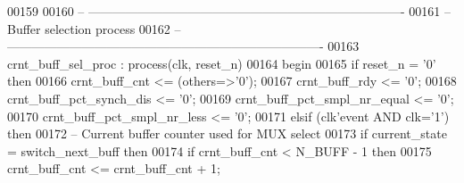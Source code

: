 \begin{DoxyCode}
00159    
00160 \textcolor{keyword}{-- ----------------------------------------------------------------------------}
00161 \textcolor{keyword}{-- Buffer selection process}
00162 \textcolor{keyword}{-- ----------------------------------------------------------------------------     }
00163    crnt\_buff\_sel\_proc : \textcolor{keywordflow}{process}(clk, reset_n)
00164 \textcolor{vhdlkeyword}{   begin}
00165       \textcolor{keywordflow}{if} \textcolor{vhdlchar}{reset_n} \textcolor{vhdlchar}{=} \textcolor{vhdlchar}{'}\textcolor{vhdllogic}{}\textcolor{vhdllogic}{0}\textcolor{vhdlchar}{'} \textcolor{keywordflow}{then} 
00166          \textcolor{vhdlchar}{crnt_buff_cnt}               \textcolor{vhdlchar}{<=} \textcolor{vhdlchar}{(}\textcolor{keywordflow}{others}\textcolor{vhdlchar}{=}\textcolor{vhdlchar}{>}\textcolor{vhdlchar}{'}\textcolor{vhdllogic}{}\textcolor{vhdllogic}{0}\textcolor{vhdlchar}{'}\textcolor{vhdlchar}{)};
00167          \textcolor{vhdlchar}{crnt_buff_rdy}               \textcolor{vhdlchar}{<=} \textcolor{vhdlchar}{'}\textcolor{vhdllogic}{}\textcolor{vhdllogic}{0}\textcolor{vhdlchar}{'};
00168          \textcolor{vhdlchar}{crnt_buff_pct_synch_dis}     \textcolor{vhdlchar}{<=} \textcolor{vhdlchar}{'}\textcolor{vhdllogic}{}\textcolor{vhdllogic}{0}\textcolor{vhdlchar}{'};
00169          \textcolor{vhdlchar}{crnt_buff_pct_smpl_nr_equal} \textcolor{vhdlchar}{<=} \textcolor{vhdlchar}{'}\textcolor{vhdllogic}{}\textcolor{vhdllogic}{0}\textcolor{vhdlchar}{'};
00170          \textcolor{vhdlchar}{crnt_buff_pct_smpl_nr_less}  \textcolor{vhdlchar}{<=} \textcolor{vhdlchar}{'}\textcolor{vhdllogic}{}\textcolor{vhdllogic}{0}\textcolor{vhdlchar}{'};
00171       \textcolor{keywordflow}{elsif} \textcolor{vhdlchar}{(}\textcolor{vhdlchar}{clk}\textcolor{vhdlchar}{'}\textcolor{vhdlkeyword}{event} \textcolor{keywordflow}{AND} \textcolor{vhdlchar}{clk}\textcolor{vhdlchar}{=}\textcolor{vhdlchar}{'}\textcolor{vhdllogic}{}\textcolor{vhdllogic}{1}\textcolor{vhdlchar}{'}\textcolor{vhdlchar}{)} \textcolor{keywordflow}{then}
00172 \textcolor{keyword}{         -- Current buffer counter used for MUX select}
00173          \textcolor{keywordflow}{if} \textcolor{vhdlchar}{current_state} \textcolor{vhdlchar}{=} \textcolor{vhdlchar}{switch\_next\_buff} \textcolor{keywordflow}{then}
00174             \textcolor{keywordflow}{if} \textcolor{vhdlchar}{crnt_buff_cnt} \textcolor{vhdlchar}{<} \textcolor{vhdlchar}{N_BUFF} \textcolor{vhdlchar}{-} \textcolor{vhdllogic}{}\textcolor{vhdllogic}{1} \textcolor{keywordflow}{then}
00175                \textcolor{vhdlchar}{crnt_buff_cnt} \textcolor{vhdlchar}{<=} \textcolor{vhdlchar}{crnt_buff_cnt} \textcolor{vhdlchar}{+} \textcolor{vhdllogic}{}\textcolor{vhdllogic}{1};

\end{DoxyCode}
